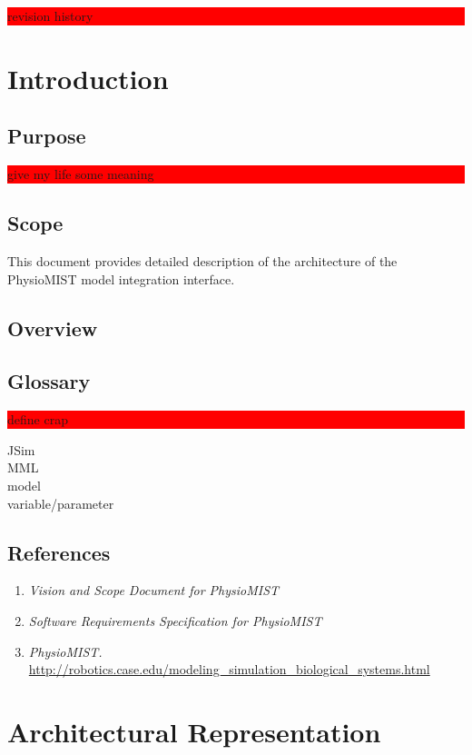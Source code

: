 \documentclass{article}
\title{\todo{PhysioMIST Design Crap}}
\author{Mark Caral, Sara Cummins, BarbaraJoy Jones, Joshua Lee}
\date{October 23, 2009\\{\sc Eecs} 393}
\newcommand{\todo}[1]{\colorbox{red}{\begin{minipage}{\textwidth}{#1}\end{minipage}}}
\begin{document}
\begin{titlepage}
\maketitle\thispagestyle{empty}
\end{titlepage}

\todo{revision history}
\newpage

\tableofcontents
\newpage

\section{Introduction}
\subsection{Purpose}
\todo{give my life some meaning}
\subsection{Scope}
This document provides detailed description of the architecture of the PhysioMIST model integration interface.
\subsection{Overview}
\subsection{Glossary}
\todo{define crap}
JSim\\
MML\\
model\\
variable/parameter
\subsection{References}
\begin{enumerate}
\item \emph{Vision and Scope Document for PhysioMIST}
\item \emph{Software Requirements Specification for PhysioMIST}
\item \emph{PhysioMIST.} \url{http://robotics.case.edu/modeling_simulation_biological_systems.html}
\end{enumerate}

\section{Architectural Representation}
\end{document}

